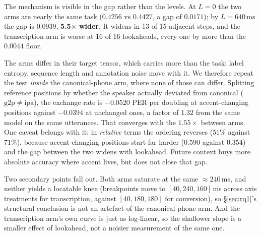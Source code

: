 \documentclass{article}
\begin{document}
The mechanism is visible in the gap rather than the levels. At $L{=}0$ the two
arms are nearly the same task ($0.4256$ vs $0.4427$, a gap of $0.0171$); by
$L{=}640$\,ms the gap is $0.0939$, \textbf{5.5$\times$ wider}. It widens in
13 of 15 adjacent steps, and the transcription arm is worse at 16 of 16
lookaheads, every one by more than the $0.0044$ floor.

The arms differ in their target tensor, which carries more than the task: label
entropy, sequence length and annotation noise move with it. We therefore repeat
the test \emph{inside} the canonical-phone arm, where none of those can differ.
Splitting reference positions by whether the speaker actually deviated from
canonical ($\mathrm{g2p}\neq\mathrm{ipa}$), the exchange rate is $-0.0520$ PER
per doubling at accent-changing positions against $-0.0394$ at unchanged ones,
a factor of $\mathbf{1.32}$ from the same model on the same utterances. That
converges with the $1.55\times$ between arms. One caveat belongs with it: in
\emph{relative} terms the ordering reverses ($51\%$ against $71\%$), because
accent-changing positions start far harder ($0.590$ against $0.354$) and the
gap between the two widens with lookahead. Future context buys more absolute
accuracy where accent lives, but does not close that gap.

Two secondary points fall out. Both arms saturate at the same
${\approx}240$\,ms, and neither yields a locatable knee (breakpoints move to
$[40, 240, 160]$\,ms across axis treatments for transcription, against
$[40, 180, 180]$ for conversion), so \S\ref{sec:rq1}'s structural conclusion is
not an artefact of the canonical-phone arm. And the transcription arm's own curve is
just as log-linear, so the shallower slope is a smaller effect of lookahead, not
a noisier measurement of the same one.
\end{document}
